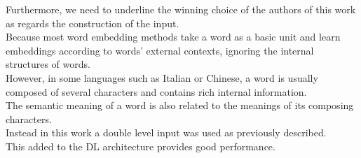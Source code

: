 \documentclass[twocolumn,10pt]{wmrDoc}
\begin{document}
Furthermore, we need to underline the winning choice of the authors \cite{DBLP:conf/clic-it/BasileSC172} of this work as regards the construction of the input.\\
Because most word embedding methods take a word as a basic unit and learn embeddings according to words’ external contexts, ignoring the internal structures of words.\\
However, in some languages such as Italian or Chinese, a word is usually composed of several characters and contains rich internal information.\\
The semantic meaning of a word is also related to the meanings of its composing characters.\\
Instead in this work a double level input was used as previously described.\\
This added to the DL architecture provides good performance.









%




\newpage


\end{document}
